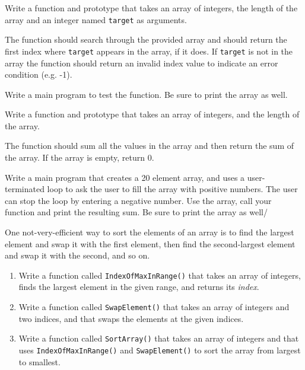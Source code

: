 \begin{exercise}
Write a function and prototype that takes an array of integers, the length of the array and an integer named
{\tt target} as arguments. 

The function should search through the provided array and should return the first index where
{\tt target} appears in the array, if it does. If {\tt target} is not in the array the function should 
return an invalid index value to indicate an error condition  (e.g.  -1).

Write a main program to test the function. Be sure to print the array as well.
\end{exercise}


\begin{exercise}
	Write a function and prototype that takes an array of integers, and the length of the array.
	
	The function should sum all the values in the array and then return the sum of the array. If the array is empty, return 0.
	
	Write a main program that creates a 20 element array, and uses a user-terminated loop to ask the user to fill the array with positive numbers. The user can stop the loop by entering a negative number. Use the array, call your function and print the resulting sum. Be sure to print the array as well/
\end{exercise}

\begin{exercise}

One not-very-efficient way to sort the elements of an array
is to find the largest element and swap it with the first
element, then find the second-largest element and swap it with
the second, and so on.

\begin{enumerate}

\item Write a function called {\tt IndexOfMaxInRange()} that 
takes an array of integers, finds the
largest element in the given range, and returns its {\em index}.

\item Write a function called {\tt SwapElement()} that takes an
array of integers and two indices, and that swaps the elements
at the given indices.

\item Write a function called {\tt SortArray()} that takes an array of
integers and that uses {\tt IndexOfMaxInRange()} and {\tt SwapElement()}
to sort the array from largest to smallest.

\end{enumerate}
\end{exercise}



